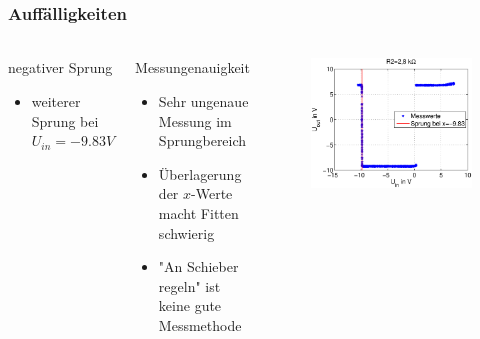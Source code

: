 \begin{frame}
\frametitle{Auffälligkeiten}
\framesubtitle{}
    \begin{columns}[c]
            \begin{block}{negativer Sprung}
                 \begin{itemize}
                     \item weiterer Sprung bei $U_{in} = -9.83V$
                 \end{itemize}
            \end{block}
            \begin{block}{Messungenauigkeit}
                 \begin{itemize}
                     \item Sehr ungenaue Messung im Sprungbereich
                     \item Überlagerung der $x$-Werte macht Fitten schwierig
                     \item "An Schieber regeln" ist keine gute Messmethode
                 \end{itemize}
            \end{block}
            \begin{figure}[H]
            \begin{center}
                    \includegraphics[scale=0.3]{./img/plots/Auf_1_2_8_Ohm_2.eps}
            \end{center}
            \end{figure}

\end{columns}
\end{frame}
